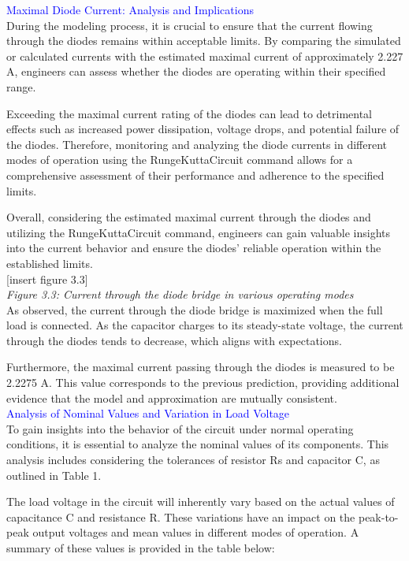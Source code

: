 \textcolor{blue}{Maximal Diode Current: Analysis and Implications}\\

During the modeling process, it is crucial to ensure that the current flowing through the diodes remains within acceptable limits. By comparing the simulated or calculated currents with the estimated maximal current of approximately 2.227 A, engineers can assess whether the diodes are operating within their specified range.

Exceeding the maximal current rating of the diodes can lead to detrimental effects such as increased power dissipation, voltage drops, and potential failure of the diodes. Therefore, monitoring and analyzing the diode currents in different modes of operation using the RungeKuttaCircuit command allows for a comprehensive assessment of their performance and adherence to the specified limits.

Overall, considering the estimated maximal current through the diodes and utilizing the RungeKuttaCircuit command, engineers can gain valuable insights into the current behavior and ensure the diodes' reliable operation within the established limits.\\

[insert figure 3.3]\\

\emph{Figure 3.3: Current through the diode bridge in various operating modes}\\

As observed, the current through the diode bridge is maximized when the full load is connected. As the capacitor charges to its steady-state voltage, the current through the diodes tends to decrease, which aligns with expectations.

Furthermore, the maximal current passing through the diodes is measured to be 2.2275 A. This value corresponds to the previous prediction, providing additional evidence that the model and approximation are mutually consistent.\\

\textcolor{blue}{Analysis of Nominal Values and Variation in Load Voltage}\\

To gain insights into the behavior of the circuit under normal operating conditions, it is essential to analyze the nominal values of its components. This analysis includes considering the tolerances of resistor Rs and capacitor C, as outlined in Table 1. 

The load voltage in the circuit will inherently vary based on the actual values of capacitance C and resistance R. These variations have an impact on the peak-to-peak output voltages and mean values in different modes of operation. A summary of these values is provided in the table below:\\

